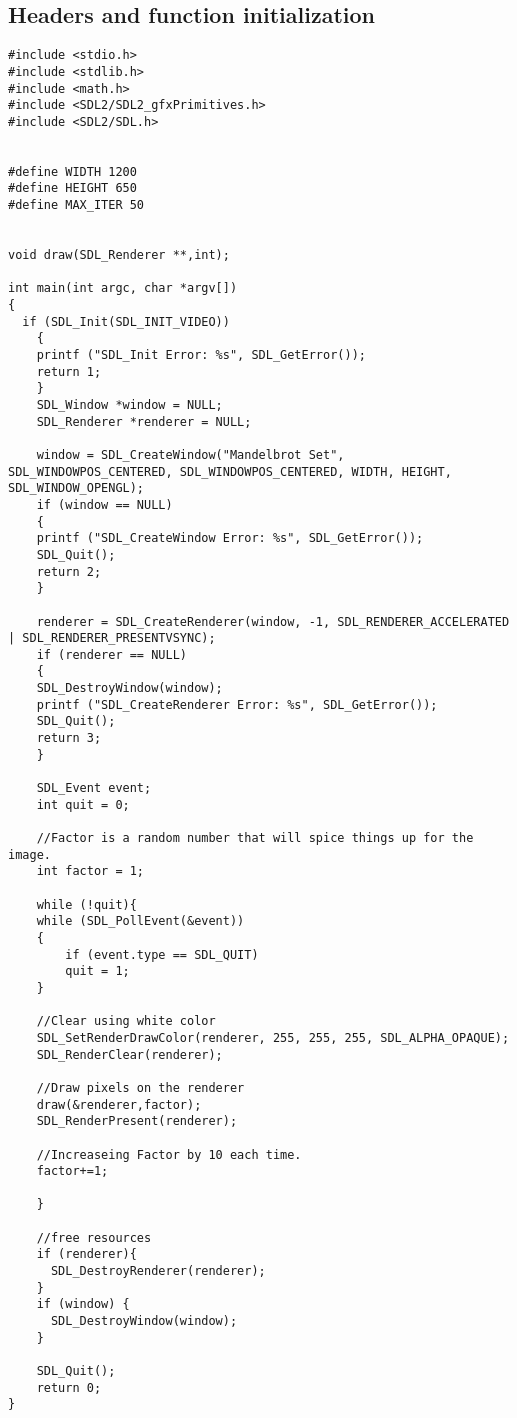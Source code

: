 \documentclass[a4paper,11pt]{article}
\begin{document}
\subsection{Headers and function initialization}
\label{sec:org52324be}
\begin{verbatim}
#include <stdio.h>
#include <stdlib.h>
#include <math.h>
#include <SDL2/SDL2_gfxPrimitives.h>
#include <SDL2/SDL.h>


#define WIDTH 1200
#define HEIGHT 650
#define MAX_ITER 50


void draw(SDL_Renderer **,int);

int main(int argc, char *argv[])
{
  if (SDL_Init(SDL_INIT_VIDEO))
    {
	printf ("SDL_Init Error: %s", SDL_GetError());
	return 1;
    }
    SDL_Window *window = NULL;
    SDL_Renderer *renderer = NULL;

    window = SDL_CreateWindow("Mandelbrot Set", SDL_WINDOWPOS_CENTERED, SDL_WINDOWPOS_CENTERED, WIDTH, HEIGHT, SDL_WINDOW_OPENGL);
    if (window == NULL)
    {
	printf ("SDL_CreateWindow Error: %s", SDL_GetError());
	SDL_Quit();
	return 2;
    }

    renderer = SDL_CreateRenderer(window, -1, SDL_RENDERER_ACCELERATED | SDL_RENDERER_PRESENTVSYNC);
    if (renderer == NULL)
    {
	SDL_DestroyWindow(window);
	printf ("SDL_CreateRenderer Error: %s", SDL_GetError());
	SDL_Quit();
	return 3;
    }

    SDL_Event event;
    int quit = 0;

    //Factor is a random number that will spice things up for the image.
    int factor = 1;

    while (!quit){
	while (SDL_PollEvent(&event))
	{
	    if (event.type == SDL_QUIT)
		quit = 1;
	}

	//Clear using white color
	SDL_SetRenderDrawColor(renderer, 255, 255, 255, SDL_ALPHA_OPAQUE);
	SDL_RenderClear(renderer);

	//Draw pixels on the renderer
	draw(&renderer,factor);
	SDL_RenderPresent(renderer);

	//Increaseing Factor by 10 each time.
	factor+=1;

    }

    //free resources
    if (renderer){
      SDL_DestroyRenderer(renderer);
    }
    if (window) {
      SDL_DestroyWindow(window);      
    }

    SDL_Quit();
    return 0;
}

\end{verbatim}
\end{document}
